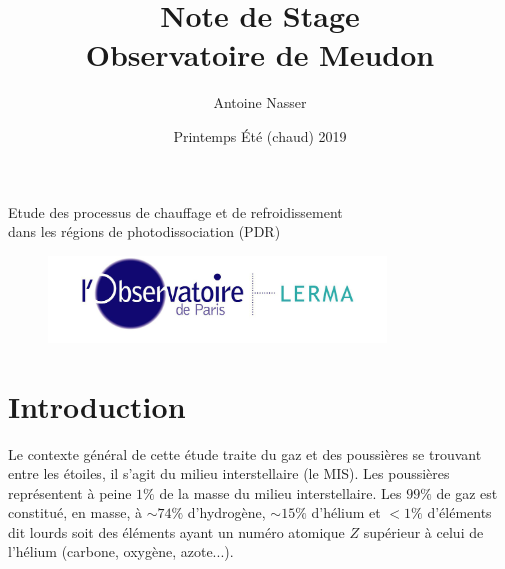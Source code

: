 \documentclass[11pt,a4paper]{article}
\title{Note de Stage\\Observatoire de Meudon}
\author{Antoine Nasser}
\date{Printemps Été (chaud) 2019}
\begin{document}
\begin{spacing}{0.98}


\maketitle
\begin{center}{\Large Etude des processus de chauffage et de refroidissement \\ dans les régions de photodissociation (PDR)}\end{center}


\setcounter{secnumdepth}{4}
\vfill
\begin{figure}[!hb]
        \centering 
        \includegraphics[trim = {0 0 0 0cm},clip,width=0.8\textwidth]{figure/LERMA2.jpg}
\end{figure}
\vfill

\newpage 

\tableofcontents

\setcounter{figure}{0}    

\newpage

 
\section*{Introduction}


Le contexte général de cette étude traite du gaz et des poussières se trouvant entre les étoiles, il s'agit du milieu interstellaire (le MIS). Les poussières représentent à peine $1\%$ de la masse du milieu interstellaire. Les $99\%$ de gaz est constitué, en masse, à $\sim 74\%$ d'hydrogène, $\sim 15\%$ d'hélium et $<1\%$ d'éléments dit \og lourds \fg{} soit des éléments ayant un numéro atomique $Z$ supérieur à celui de l'hélium (carbone, oxygène, azote...).\newline 



\end{spacing}
\end{document}
